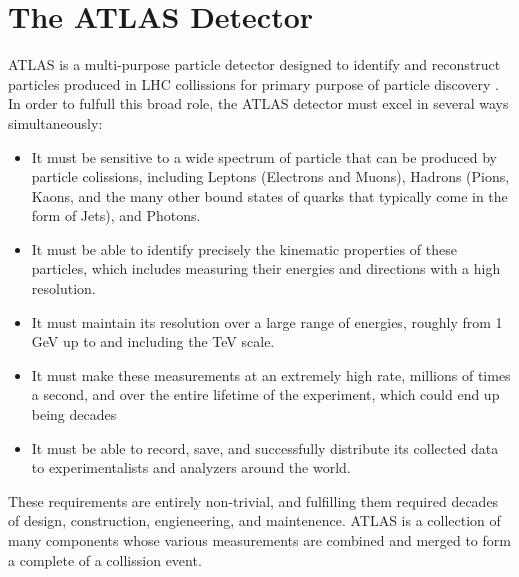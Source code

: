 %
%
%

\section{The ATLAS Detector}
ATLAS is a multi-purpose particle detector designed to identify and reconstruct particles produced in LHC collissions for primary purpose of particle discovery \cite{ATLAS_TDR}.
In order to fulfull this broad role, the ATLAS detector must excel in several ways simultaneously:

\begin{itemize}
  \item It must be sensitive to a wide spectrum of particle that can be produced by particle colissions, including Leptons (Electrons and Muons), Hadrons (Pions, Kaons, and the many other bound states of quarks that typically come in the form of Jets), and Photons.
  \item It must be able to identify precisely the kinematic properties of these particles, which includes measuring their energies and directions with a high resolution.
  \item It must maintain its resolution over a large range of energies, roughly from 1 GeV up to and including the TeV scale.
  \item It must make these measurements at an extremely high rate, millions of times a second, and over the entire lifetime of the experiment, which could end up being decades
  \item It must be able to record, save, and successfully distribute its collected data to experimentalists and analyzers around the world.
\end{itemize}

These requirements are entirely non-trivial, and fulfilling them required decades of design, construction, engieneering, and maintenence.  
ATLAS is a collection of many components whose various measurements are combined and merged to form a complete of a collission event.




